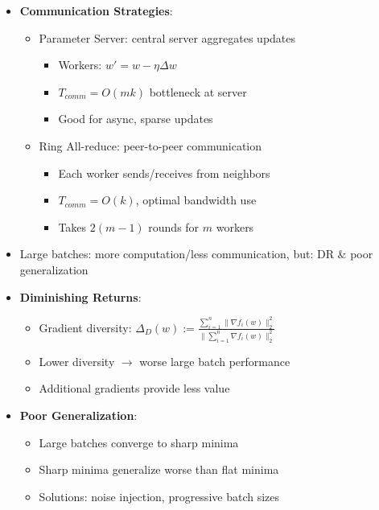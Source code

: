 \documentclass[8pt,letter,landscape]{article}
\begin{document}
\begin{multicols*}{3}
\begin{itemize}[leftmargin=*,nosep]
    \item \textbf{Communication Strategies}:
    \begin{itemize}[leftmargin=*,nosep]
        \item Parameter Server: central server aggregates updates
        \begin{itemize}[leftmargin=*,nosep]
            \item Workers: $w' = w - \eta\Delta w$
            \item $T_{comm} = O(mk)$ bottleneck at server
            \item Good for async, sparse updates
        \end{itemize}
        \item Ring All-reduce: peer-to-peer communication
        \begin{itemize}[leftmargin=*,nosep]
            \item Each worker sends/receives from neighbors
            \item $T_{comm} = O(k)$, optimal bandwidth use
            \item Takes $2(m-1)$ rounds for $m$ workers
        \end{itemize}
    \end{itemize}

    \item Large batches: more computation/less communication, but: DR \& poor generalization

    \item \textbf{Diminishing Returns}:
    \begin{itemize}[leftmargin=*,nosep]
        \item Gradient diversity: $\Delta_D(w) := \frac{\sum_{i=1}^n \|\nabla f_i(w)\|_2^2}{\|\sum_{i=1}^n \nabla f_i(w)\|_2^2}$
        \item Lower diversity $\rightarrow$ worse large batch performance
        \item Additional gradients provide less value
    \end{itemize}

    \item \textbf{Poor Generalization}:
    \begin{itemize}[leftmargin=*,nosep]
        \item Large batches converge to sharp minima
        \item Sharp minima generalize worse than flat minima
        \item Solutions: noise injection, progressive batch sizes
    \end{itemize}


\end{itemize}
\end{multicols*}
\end{document}
